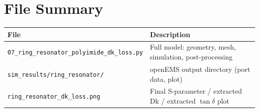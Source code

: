 \documentclass[11pt]{article}
\begin{document}
\section{File Summary}

\begin{center}
\begin{tabular}{@{}ll@{}}
\toprule
\textbf{File} & \textbf{Description} \\
\midrule
\texttt{07\_ring\_resonator\_polyimide\_dk\_loss.py} & Full model: geometry, mesh, simulation, post-processing \\
\texttt{sim\_results/ring\_resonator/} & openEMS output directory (port data, plot) \\
\texttt{ring\_resonator\_dk\_loss.png} & Final S-parameter / extracted Dk / extracted $\tan\delta$ plot \\
\bottomrule
\end{tabular}
\end{center}
\end{document}
